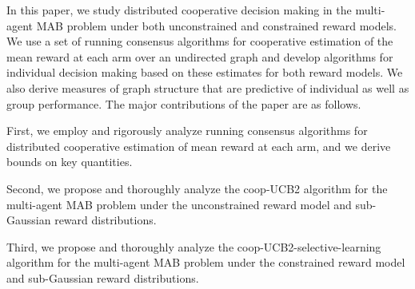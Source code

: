 \documentclass[final,5p,times,twocolumn]{elsarticle}
\theoremstyle{definition}
\newcommand \vs[1]{{\color{blue} #1}}
\begin{document}


In this paper, we study distributed cooperative decision making in the multi-agent MAB problem under both unconstrained and constrained reward models.  We use a set of running consensus algorithms for cooperative estimation of the mean reward at each arm over an undirected graph and develop algorithms for individual decision making based on these estimates for both reward models. We also derive measures of graph structure that are predictive of 
individual as well as group performance. The major contributions of the paper are as follows.

%

First, we employ and rigorously analyze running consensus algorithms for distributed cooperative estimation of mean reward at each arm, and we derive bounds on key quantities. 

Second, we propose and thoroughly analyze  the coop-UCB2 algorithm for the multi-agent MAB problem under the unconstrained reward model and sub-Gaussian reward distributions. 

Third, we propose and thoroughly analyze the coop-UCB2-selective-learning algorithm for the multi-agent MAB problem under the constrained reward model and sub-Gaussian reward distributions.  
\end{document}
